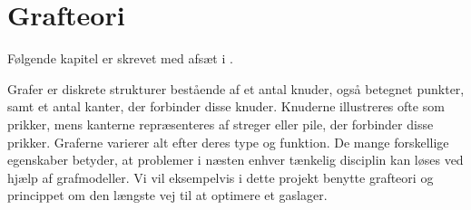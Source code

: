 \chapter{Grafteori}
Følgende kapitel er skrevet med afsæt i \citep{dmat}.

Grafer er diskrete strukturer bestående af et antal knuder, også betegnet punkter, samt et antal kanter, der forbinder disse knuder. Knuderne illustreres ofte som prikker, mens kanterne repræsenteres af streger eller pile, der forbinder disse prikker. Graferne varierer alt efter deres type og funktion. De mange forskellige egenskaber betyder, at problemer i næsten enhver tænkelig disciplin kan løses ved hjælp af grafmodeller. Vi vil eksempelvis i dette projekt benytte grafteori og princippet om den længste vej til at optimere et gaslager.















